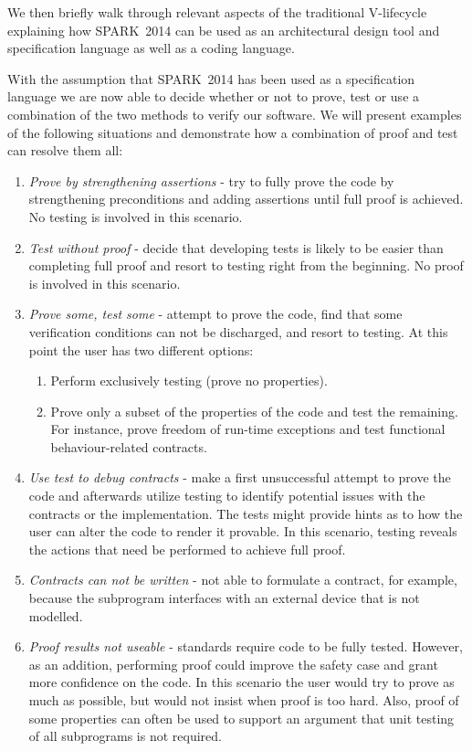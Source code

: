 \documentclass{llncs}
\newcommand{\newspark}{SPARK~2014\xspace}
\begin{document}
We then briefly walk through relevant aspects of the traditional 
V-lifecycle explaining how \newspark can be used as an architectural
design tool and specification language as well as a coding language.

With the assumption that \newspark has been used as a specification
language we are now able to decide
whether or not to prove, test or use a combination of the two methods
to verify our software.
We will present examples of the following situations and demonstrate how
a combination of proof and test can resolve them all:
\begin {enumerate}
\item \emph{Prove by strengthening assertions} - try to fully prove
  the code by strengthening preconditions and adding assertions until
  full proof is achieved. No testing is involved in this scenario.

\item \emph{Test without proof} - decide that developing tests is
  likely to be easier than completing full proof and resort to testing 
  right from the beginning. No proof is involved in this scenario.

\item \emph{Prove some, test some} - attempt to prove the code, 
  find that some verification conditions can not be discharged,
  and resort to testing. At this point the user has two different
  options:

  \begin{enumerate}
  \item Perform exclusively testing (prove no properties).

  \item Prove only a subset of the properties of the code and test the
    remaining. For instance, prove freedom of run-time exceptions and
    test functional behaviour-related contracts.
  \end{enumerate}

\item \emph{Use test to debug contracts} - make a first unsuccessful
  attempt to prove the code and afterwards utilize testing to identify
  potential issues with the contracts or the implementation. The tests
  might provide hints as to how the user can alter the code to render
  it provable. In this scenario, testing reveals the actions that need
  be performed to achieve full proof. 

\item \emph{Contracts can not be written} - not able to formulate a
  contract, for example, because the subprogram interfaces with an
  external device that is not modelled.

\item \emph{Proof results not useable} - standards require code to
  be fully tested. However, as an addition, performing proof could
  improve the safety case and grant more confidence on the code. In
  this scenario the user would try to prove as much as possible, but
  would not insist when proof is too hard. Also, proof of some 
  properties can often be used to support an argument that 
  unit testing of all subprograms is not required.

\end{enumerate}
\end{document}
